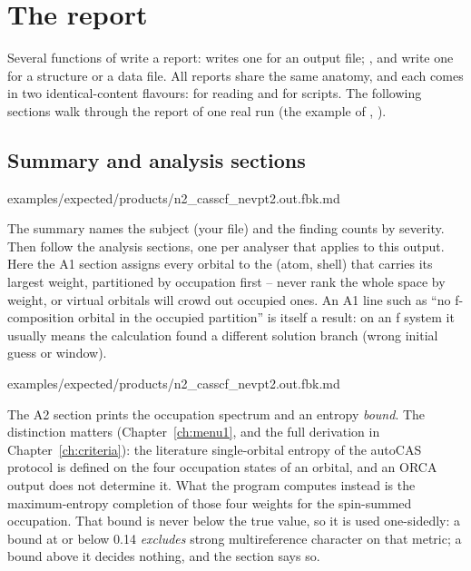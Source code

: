 \chapter{The report}
\label{ch:report}

Several functions of \fbk{} write a report:  writes one for an output
file; ,  and  write one for a structure or a data
file. All reports share the same anatomy, and each comes in two identical-content
flavours:  for reading and  for scripts.
The following sections walk through the report of one real run (the example of
, ).

\section{Summary and analysis sections}


  {examples/expected/products/n2_casscf_nevpt2.out.fbk.md}

The summary names the subject (your file) and the finding counts by severity.
Then follow the analysis sections, one per analyser that applies to this output.
Here the A1 section assigns every orbital to the (atom, shell) that carries its
largest weight, partitioned by occupation first -- never rank the whole space by
weight, or virtual orbitals will crowd out occupied ones. An A1 line such as
``no f-composition orbital in the occupied partition'' is itself a result: on
an f system it usually means the calculation found a different solution branch
(wrong initial guess or window).


  {examples/expected/products/n2_casscf_nevpt2.out.fbk.md}

The A2 section prints the occupation spectrum and an entropy \emph{bound}. The
distinction matters (Chapter~\ref{ch:menu1}, and the full derivation in
Chapter~\ref{ch:criteria}): the literature single-orbital entropy of the
autoCAS protocol is defined on the four occupation states of an orbital, and an
ORCA output does not determine it. What the program computes instead is the
maximum-entropy completion of those four weights for the spin-summed
occupation. That bound is never below the true value, so it is used one-sidedly:
a bound at or below 0.14 \emph{excludes} strong multireference character on that
metric; a bound above it decides nothing, and the section says so.

